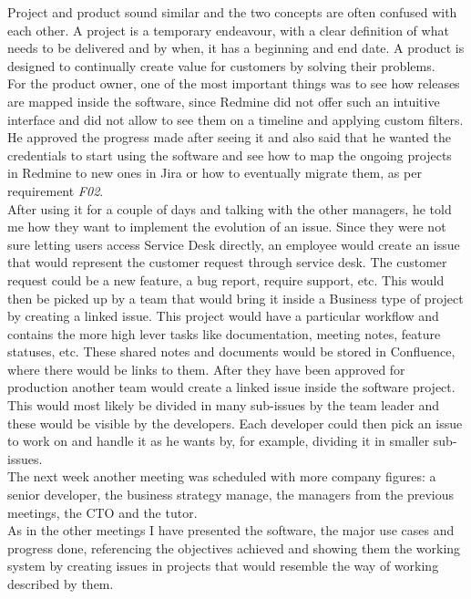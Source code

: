 	Project and product sound similar and the two concepts are often confused with each other.
	A project is a temporary endeavour, with a clear definition of what needs to be delivered and by when, it has a beginning and end date.
	A product is designed to continually create value for customers by solving their problems\cite{product}.\\
	For the product owner, one of the most important things was to see how releases are mapped inside the software, since Redmine did not offer such an intuitive interface and did not allow to see them on a timeline and applying custom filters.
	He approved the progress made after seeing it and also said that he wanted the credentials to start using the software and see how to map the ongoing projects in Redmine to new ones in Jira or how to eventually migrate them, as per requirement \textit{F02}.\\
	After using it for a couple of days and talking with the other managers, he told me how they want to implement the evolution of an issue.
	Since they were not sure letting users access Service Desk directly, an employee would create an issue that would represent the customer request through service desk.
	The customer request could be a new feature, a bug report, require support, etc.
	This would then be picked up by a team that would bring it inside a Business type of project by creating a linked issue.
	This project would have a particular workflow and contains the more high lever tasks like documentation, meeting notes, feature statuses, etc.
	These shared notes and documents would be stored in Confluence, where there would be links to them.
	After they have been approved for production another team would create a linked issue inside the software project.
	This would most likely be divided in many sub-issues by the team leader and these would be visible by the developers.
	Each developer could then pick an issue to work on and handle it as he wants by, for example, dividing it in smaller sub-issues.\\
	The next week another meeting was scheduled with more company figures: a senior developer, the business strategy manage, the managers from the previous meetings, the CTO and the tutor.\\
	As in the other meetings I have presented the software, the major use cases and progress done, referencing the objectives achieved and showing them the working system by creating issues in projects that would resemble the way of working described by them.\\
